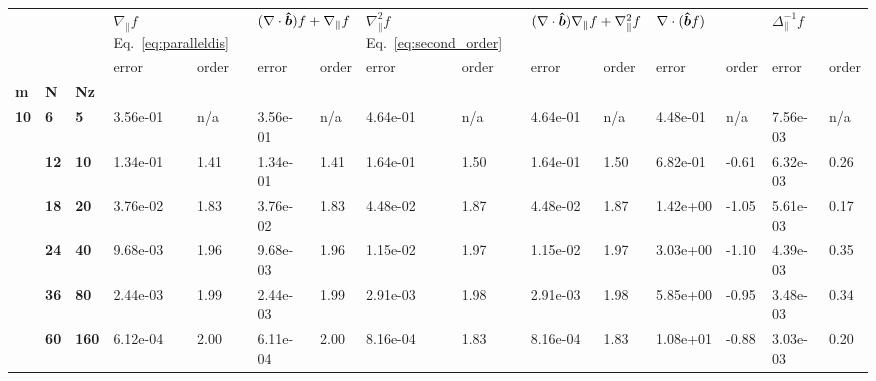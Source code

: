 \begin{tabular}{lllllllllllllll}
\toprule
  &     &     & \multicolumn{2}{l}{$\nabla_\parallel f$
  Eq.~\eqref{eq:paralleldis}} & \multicolumn{2}{l}{$(\nabla\cdot\bm{\hat{b}}) f +
  \nabla_\parallel f$} &
  \multicolumn{2}{l}{$\nabla_\parallel^2 f$ Eq.~\eqref{eq:second_order}} &
  \multicolumn{2}{l}{$(\nabla\cdot\bm{\hat{b}})\nabla_\parallel f + \nabla_\parallel^2
  f$} & \multicolumn{2}{l}{$\nabla\cdot(\bm{\hat{b}} f)$} &
  \multicolumn{2}{l}{$\Delta_\parallel^{-1}f $} \\
  &    &     &     error & order &             error & order &     error & order &     error & order &       error &  order &          error & order \\
\textbf{m} & \textbf{N} & \textbf{Nz} &           &       &                   &       &           &       &           &       &             &        &                &       \\
\midrule
\textbf{10} & \textbf{6 } & \textbf{5  } &  3.56e-01 &   n/a &          3.56e-01 &   n/a &  4.64e-01 &   n/a &  4.64e-01 &   n/a &    4.48e-01 &    n/a &       7.56e-03 &   n/a \\
  & \textbf{12} & \textbf{10 } &  1.34e-01 &  1.41 &          1.34e-01 &  1.41 &  1.64e-01 &  1.50 &  1.64e-01 &  1.50 &    6.82e-01 &  -0.61 &       6.32e-03 &  0.26 \\
  & \textbf{18} & \textbf{20 } &  3.76e-02 &  1.83 &          3.76e-02 &  1.83 &  4.48e-02 &  1.87 &  4.48e-02 &  1.87 &    1.42e+00 &  -1.05 &       5.61e-03 &  0.17 \\
  & \textbf{24} & \textbf{40 } &  9.68e-03 &  1.96 &          9.68e-03 &  1.96 &  1.15e-02 &  1.97 &  1.15e-02 &  1.97 &    3.03e+00 &  -1.10 &       4.39e-03 &  0.35 \\
  & \textbf{36} & \textbf{80 } &  2.44e-03 &  1.99 &          2.44e-03 &  1.99 &  2.91e-03 &  1.98 &  2.91e-03 &  1.98 &    5.85e+00 &  -0.95 &       3.48e-03 &  0.34 \\
  & \textbf{60} & \textbf{160} &  6.12e-04 &  2.00 &          6.11e-04 &  2.00 &  8.16e-04 &  1.83 &  8.16e-04 &  1.83 &    1.08e+01 &  -0.88 &       3.03e-03 &  0.20 \\
\bottomrule
\end{tabular}
